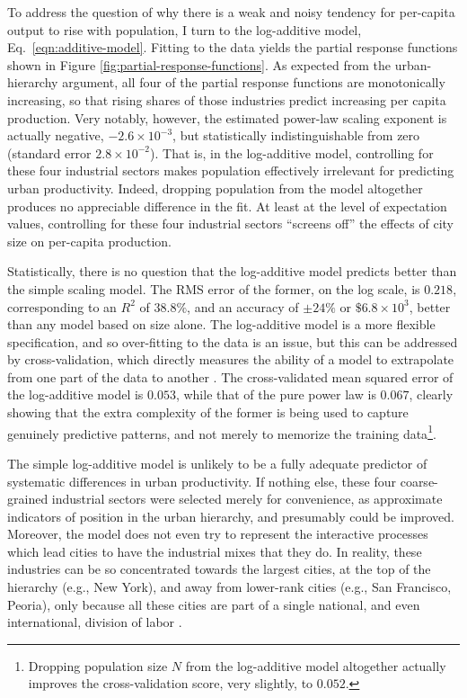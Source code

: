 \documentclass{pnastwo}
\begin{document}
\begin{article}
To address the question of why there is a weak and noisy tendency for
per-capita output to rise with population, I turn to the log-additive model,
Eq.\ \ref{eqn:additive-model}.  Fitting to the data yields the partial response
functions shown in Figure \ref{fig:partial-response-functions}.  As expected
from the urban-hierarchy argument, all four of the partial response functions
are monotonically increasing, so that rising shares of those industries predict
increasing per capita production.  Very notably, however, the estimated
power-law scaling exponent is actually negative, $-2.6\times{10}^{-3}$, but
statistically indistinguishable from zero (standard error
$2.8\times{10}^{-2}$).  That is, in the log-additive model, controlling for
these four industrial sectors makes population effectively irrelevant for
predicting urban productivity.  Indeed, dropping population from the model
altogether produces no appreciable difference in the fit.  At least at the
level of expectation values, controlling for these four industrial sectors
``screens off'' the effects of city size on per-capita production.

Statistically, there is no question that the log-additive model predicts better
than the simple scaling model.  The RMS error of the former, on the log scale,
is $0.218$, corresponding to an $R^2$ of $38.8\%$, and an accuracy of $\pm
24\%$ or $\$6.8\times{10}^3$, better than any model based on size alone.  The
log-additive model is a more flexible specification, and so over-fitting to the
data is an issue, but this can be addressed by cross-validation, which directly
measures the ability of a model to extrapolate from one part of the data to
another \cite{tEoSL-2nd}.  The cross-validated mean squared error of the
log-additive model is $0.053$, while that of the pure power law is $0.067$,
clearly showing that the extra complexity of the former is being used to
capture genuinely predictive patterns, and not merely to memorize the training
data\footnote{Dropping population size $N$ from the log-additive model
  altogether actually improves the cross-validation score, very slightly, to
  $0.052$.}.

The simple log-additive model is unlikely to be a fully adequate predictor of
systematic differences in urban productivity.  If nothing else, these four
coarse-grained industrial sectors were selected merely for convenience, as
approximate indicators of position in the urban hierarchy, and presumably could
be improved.  Moreover, the model does not even try to represent the
interactive processes which lead cities to have the industrial mixes that they
do.  In reality, these industries can be so concentrated towards the largest
cities, at the top of the hierarchy (e.g., New York), and away from lower-rank
cities (e.g., San Francisco, Peoria), only because all these cities are part of
a single national, and even international, division of labor
\cite{Fujita-Krugman-Venables}.






\end{article}
\end{document}
